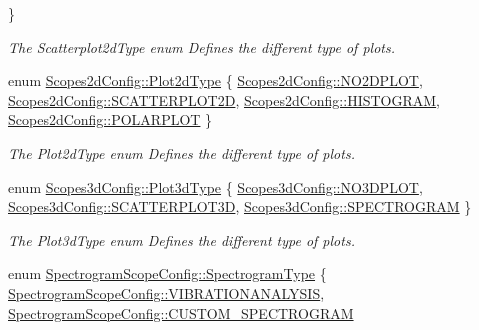 \begin{DoxyCompactItemize}
 \}
\begin{DoxyCompactList}\small\item\em \-The \-Scatterplot2d\-Type enum \-Defines the different type of plots. \end{DoxyCompactList}\item 
enum \hyperlink{group___scope_plugin_ga0fad4d5fa165d3cf65c53a66501eb830}{\-Scopes2d\-Config\-::\-Plot2d\-Type} \{ \hyperlink{group___scope_plugin_gga0fad4d5fa165d3cf65c53a66501eb830a8a05ed744e85e763986c4c55bf561e67}{\-Scopes2d\-Config\-::\-N\-O2\-D\-P\-L\-O\-T}, 
\hyperlink{group___scope_plugin_gga0fad4d5fa165d3cf65c53a66501eb830a4cc6659e6c550e7a821db4ad6d3ed4dc}{\-Scopes2d\-Config\-::\-S\-C\-A\-T\-T\-E\-R\-P\-L\-O\-T2\-D}, 
\hyperlink{group___scope_plugin_gga0fad4d5fa165d3cf65c53a66501eb830a7f84951522a86b7b7a00ccc4fc58ad5a}{\-Scopes2d\-Config\-::\-H\-I\-S\-T\-O\-G\-R\-A\-M}, 
\hyperlink{group___scope_plugin_gga0fad4d5fa165d3cf65c53a66501eb830a6d9b3ec0d944281832f5d0b2d474106a}{\-Scopes2d\-Config\-::\-P\-O\-L\-A\-R\-P\-L\-O\-T}
 \}
\begin{DoxyCompactList}\small\item\em \-The \-Plot2d\-Type enum \-Defines the different type of plots. \end{DoxyCompactList}\item 
enum \hyperlink{group___scope_plugin_ga50e7b7155f87047a171af78191828496}{\-Scopes3d\-Config\-::\-Plot3d\-Type} \{ \hyperlink{group___scope_plugin_gga50e7b7155f87047a171af78191828496ae3b1069e4985d5e50337e7bd39969e74}{\-Scopes3d\-Config\-::\-N\-O3\-D\-P\-L\-O\-T}, 
\hyperlink{group___scope_plugin_gga50e7b7155f87047a171af78191828496a48fce9291e9e40ea180ad0d14f5bce39}{\-Scopes3d\-Config\-::\-S\-C\-A\-T\-T\-E\-R\-P\-L\-O\-T3\-D}, 
\hyperlink{group___scope_plugin_gga50e7b7155f87047a171af78191828496a84544a635d05fc1c4c6a7a273653d59e}{\-Scopes3d\-Config\-::\-S\-P\-E\-C\-T\-R\-O\-G\-R\-A\-M}
 \}
\begin{DoxyCompactList}\small\item\em \-The \-Plot3d\-Type enum \-Defines the different type of plots. \end{DoxyCompactList}\item 
enum \hyperlink{group___scope_plugin_ga4c227eca53956a4dda5ee8877b7868c6}{\-Spectrogram\-Scope\-Config\-::\-Spectrogram\-Type} \{ \hyperlink{group___scope_plugin_gga4c227eca53956a4dda5ee8877b7868c6a1412daaa24267bf3b82a82d8b8427238}{\-Spectrogram\-Scope\-Config\-::\-V\-I\-B\-R\-A\-T\-I\-O\-N\-A\-N\-A\-L\-Y\-S\-I\-S}, 
\hyperlink{group___scope_plugin_gga4c227eca53956a4dda5ee8877b7868c6a7f0d2eab37446fb5b0e0136911fa069f}{\-Spectrogram\-Scope\-Config\-::\-C\-U\-S\-T\-O\-M\-\_\-\-S\-P\-E\-C\-T\-R\-O\-G\-R\-A\-M}

\end{DoxyCompactItemize}

